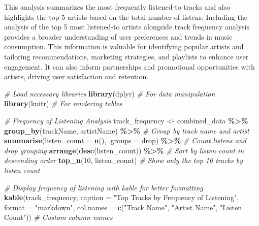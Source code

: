 \documentclass[
]{article}
\newenvironment{Shaded}{\begin{snugshade}}{\end{snugshade}}
\newcommand{\AttributeTok}[1]{\textcolor[rgb]{0.13,0.29,0.53}{#1}}
\newcommand{\CommentTok}[1]{\textcolor[rgb]{0.56,0.35,0.01}{\textit{#1}}}
\newcommand{\DecValTok}[1]{\textcolor[rgb]{0.00,0.00,0.81}{#1}}
\newcommand{\FunctionTok}[1]{\textcolor[rgb]{0.13,0.29,0.53}{\textbf{#1}}}
\newcommand{\NormalTok}[1]{#1}
\newcommand{\OtherTok}[1]{\textcolor[rgb]{0.56,0.35,0.01}{#1}}
\newcommand{\SpecialCharTok}[1]{\textcolor[rgb]{0.81,0.36,0.00}{\textbf{#1}}}
\newcommand{\StringTok}[1]{\textcolor[rgb]{0.31,0.60,0.02}{#1}}
\begin{document}
This analysis summarizes the most frequently listened-to tracks and also
highlights the top 5 artists based on the total number of listens.
Including the analysis of the top 5 most listened-to artists alongside
track frequency analysis provides a broader understanding of user
preferences and trends in music consumption. This information is
valuable for identifying popular artists and tailoring recommendations,
marketing strategies, and playlists to enhance user engagement. It can
also inform partnerships and promotional opportunities with artists,
driving user satisfaction and retention.

\begin{Shaded}
\begin{Highlighting}[]
\CommentTok{\# Load necessary libraries}
\FunctionTok{library}\NormalTok{(dplyr)      }\CommentTok{\# For data manipulation}
\FunctionTok{library}\NormalTok{(knitr)      }\CommentTok{\# For rendering tables}

\CommentTok{\# Frequency of Listening Analysis}
\NormalTok{track\_frequency }\OtherTok{\textless{}{-}}\NormalTok{ combined\_data }\SpecialCharTok{\%\textgreater{}\%}
  \FunctionTok{group\_by}\NormalTok{(trackName, artistName) }\SpecialCharTok{\%\textgreater{}\%}  \CommentTok{\# Group by track name and artist}
  \FunctionTok{summarise}\NormalTok{(}\AttributeTok{listen\_count =} \FunctionTok{n}\NormalTok{(), }\AttributeTok{.groups =} \StringTok{\textquotesingle{}drop\textquotesingle{}}\NormalTok{) }\SpecialCharTok{\%\textgreater{}\%}  \CommentTok{\# Count listens and drop grouping}
  \FunctionTok{arrange}\NormalTok{(}\FunctionTok{desc}\NormalTok{(listen\_count)) }\SpecialCharTok{\%\textgreater{}\%}  \CommentTok{\# Sort by listen count in descending order}
  \FunctionTok{top\_n}\NormalTok{(}\DecValTok{10}\NormalTok{, listen\_count)  }\CommentTok{\# Show only the top 10 tracks by listen count}

\CommentTok{\# Display frequency of listening with kable for better formatting}
\FunctionTok{kable}\NormalTok{(track\_frequency, }\AttributeTok{caption =} \StringTok{"Top Tracks by Frequency of Listening"}\NormalTok{, }\AttributeTok{format =} \StringTok{"markdown"}\NormalTok{, }
      \AttributeTok{col.names =} \FunctionTok{c}\NormalTok{(}\StringTok{"Track Name"}\NormalTok{, }\StringTok{"Artist Name"}\NormalTok{, }\StringTok{"Listen Count"}\NormalTok{))  }\CommentTok{\# Custom column names}
\end{Highlighting}
\end{Shaded}
\end{document}
